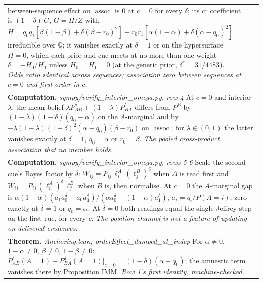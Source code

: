 \documentclass[10pt]{article}
\theoremstyle{definition}
\newcommand{\PB}{P^{\mathrm{B}}}
\newcommand{\assoc}{\operatorname{assoc}}
\newlength{\fullw}\setlength{\fullw}{25.9cm}
\begin{document}
{\begin{longtable}{|p{0.9cm}|p{12.2cm}|p{12.2cm}|}
{between-sequence effect on $\assoc$ is $0$ at $c=0$ for every $\delta$; its $c^1$
coefficient is $(1-\delta)\,G$, $G=H/Z$ with
$H=q_0q_1[\beta(1-\beta)+\delta(\beta-r_0)^2]-r_0r_1[\alpha(1-\alpha)+\delta(\alpha-q_0)^2]$
irreducible over $\mathbb Q$; it vanishes exactly at $\delta=1$ or on the hypersurface
$H=0$, which each prior and cue meets at no more than one weight
$\delta=-H_0/H_1$ unless $H_0=H_1=0$ (at the generic prior, $\delta^*=31/4483$). \newline \textit{Odds ratio identical across sequences; association zero between sequences at $c=0$ and first order in $c$.}} \\
\multicolumn{3}{|p{\fullw}|}{\textbf{Computation.} \textit{sympy/verify\_interior\_omega.py, row 4} \newline At $c=0$ and interior $\lambda$, the mean belief
$\lambda P^{\delta}_{AB}+(1-\lambda)P^{\delta}_{BA}$ differs from $\PB$ by
$(1-\lambda)(1-\delta)(q_0-\alpha)$ on the $A$-marginal and by
$-\lambda(1-\lambda)(1-\delta)^2(\alpha-q_0)(\beta-r_0)$ on $\assoc$; for $\lambda\in(0,1)$
the latter vanishes exactly at $\delta=1$, $q_0=\alpha$ or $r_0=\beta$. \newline \textit{The pooled cross-product association that no member holds.}} \\
\multicolumn{3}{|p{\fullw}|}{\textbf{Computation.} \textit{sympy/verify\_interior\_omega.py, rows 5-6} \newline Scale the second cue's Bayes factor by $\delta$:
$W_{ij}=P_{ij}\,\ell^A_i\,(\ell^B_j)^{\delta}$ when $A$ is read first and
$W_{ij}=P_{ij}\,(\ell^A_i)^{\delta}\,\ell^B_j$ when $B$ is, then normalise. At $c=0$
the $A$-marginal gap is $\alpha(1-\alpha)(a_1a_0^{\delta}-a_0a_1^{\delta})/(\alpha a_0^{\delta}+(1-\alpha)a_1^{\delta})$,
$a_i=q_i/P(A{=}i)$, zero exactly at $\delta=1$ or $q_0=\alpha$. At $\delta=0$ both readings equal the single Jeffrey step on the
first cue, for every $c$. \newline \textit{The position channel is not a feature of updating on delivered credences.}} \\
\multicolumn{3}{|p{\fullw}|}{\textbf{Theorem.} \textit{Anchoring.lean, orderEffect\_damped\_at\_indep} \newline For $\alpha\neq0$, $1-\alpha\neq0$, $\beta\neq0$, $1-\beta\neq0$:
$P^{\delta}_{AB}(A{=}1)-P^{\delta}_{BA}(A{=}1)\big|_{c=0}=(1-\delta)(\alpha-q_0)$; the
amnestic term vanishes there by Proposition IMM. \newline \textit{Row 1's first identity, machine-checked.}} \\

\end{longtable}}
\end{document}
